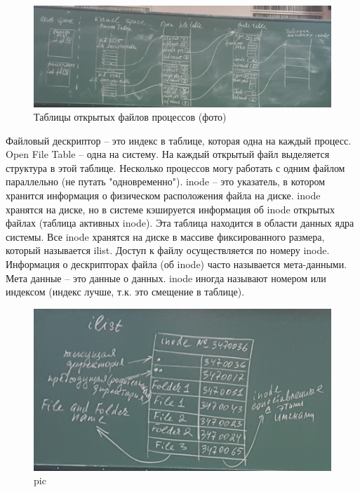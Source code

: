 \begin{figure}[H]
  \centering
  \includegraphics[width=\textwidth]{pic/3.png}
  \caption{Таблицы открытых файлов процессов (фото)}
\end{figure}

Файловый дескриптор – это индекс в таблице, которая  одна на каждый процесс. 
Open File Table – одна на систему.  На каждый открытый файл выделяется структура в этой таблице. 
Несколько процессов могу работать с одним файлом параллельно (не путать "одновременно"). 
inode – это указатель, в котором хранится информация о физическом расположения файла на диске. inode хранятся на диске, но в системе кэшируется информация об inode открытых файлах (таблица активных inode). Эта таблица находится в области данных ядра системы.
Все inode хранятся на диске в массиве фиксированного размера, который называется ilist.
Доступ к файлу осуществляется по номеру inode. Информация о дескрипторах файла (об inode) часто называется мета-данными. Мета данные – это данные о данных.
inode иногда называют номером или индексом (индекс лучше, т.к. это смещение в таблице).

\begin{figure}[H]
  \centering
  \includegraphics[width=\textwidth]{pic/4.png}
  \caption{pic}
\end{figure}

